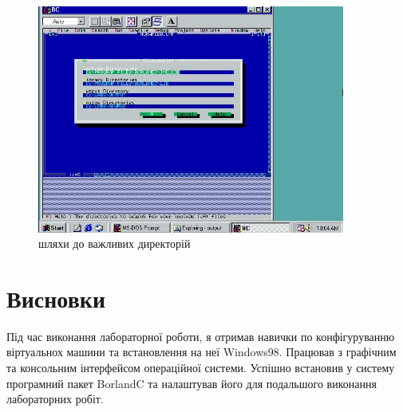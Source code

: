 \begin{figure}[h]
    \centering
    \includegraphics[width=0.9\textwidth]{reports/AC/lab1/assets/33.jpeg}
    \caption{шляхи до важливих директорій}
\end{figure}



\section{Висновки}
Під час виконання лабораторної роботи, я отримав навички по конфігуруванню віртуальнох машини та встановлення на неї Windows98. Працював з графічним та консольним інтерфейсом операційної системи. Успішно встановив у систему програмний пакет BorlandC та налаштував його для подальшого виконання лабораторних робіт.

